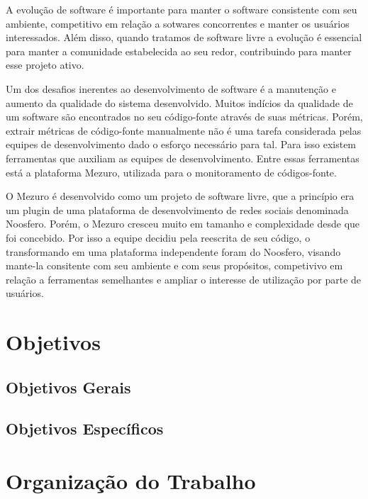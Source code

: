 A evolução de software é importante para manter o software consistente com seu ambiente, competitivo em relação a sotwares concorrentes e manter os usuários interessados. Além disso, quando tratamos de software livre a evolução é essencial para manter a comunidade estabelecida ao seu redor, contribuindo para manter esse projeto ativo.  

Um dos desafios inerentes ao desenvolvimento de software é a manutenção e aumento da qualidade do sistema desenvolvido. Muitos indícios da qualidade de um software são encontrados no seu código-fonte através de suas métricas. Porém, extrair métricas de código-fonte manualmente não é uma tarefa considerada pelas equipes de desenvolvimento dado o esforço necessário para tal. Para isso existem ferramentas que auxiliam as equipes de desenvolvimento. Entre essas ferramentas está a plataforma Mezuro, utilizada para o monitoramento de códigos-fonte.

O Mezuro é desenvolvido como um projeto de software livre, que a princípio era um plugin de uma plataforma de desenvolvimento de redes sociais denominada Noosfero. Porém, o Mezuro cresceu muito em tamanho e complexidade desde que foi concebido. Por isso a equipe decidiu pela reescrita de seu código, o transformando em uma plataforma independente foram do Noosfero, visando mante-la consitente com seu ambiente e com seus propósitos, competivivo em relação a ferramentas semelhantes e ampliar o interesse de utilização por parte de usuários. 

\section{Objetivos}

\subsection{Objetivos Gerais}

\subsection{Objetivos Específicos}

\section{Organização do Trabalho}
